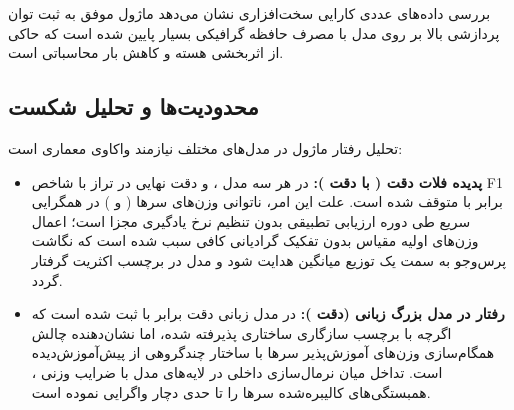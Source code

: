 بررسی داده‌های عددی کارایی سخت‌افزاری نشان می‌دهد ماژول موفق به ثبت توان پردازشی بالا  بر روی مدل  با مصرف حافظه گرافیکی بسیار پایین  شده است که حاکی از اثربخشی هسته  و کاهش بار محاسباتی است.

\subsection{محدودیت‌ها و تحلیل شکست}
تحلیل رفتار ماژول در مدل‌های مختلف نیازمند واکاوی معماری است:
\begin{itemize}
    \item \textbf{پدیده فلات دقت ( با دقت ):} در هر سه مدل ،  و  دقت نهایی در تراز  با شاخص F1 برابر با  متوقف شده است. علت این امر، ناتوانی وزن‌های سرها ( و ) در همگرایی سریع طی دوره ارزیابی تطبیقی بدون تنظیم نرخ یادگیری مجزا است؛ اعمال وزن‌های اولیه مقیاس بدون تفکیک گرادیانی کافی سبب شده است که نگاشت پرس‌وجو به سمت یک توزیع میانگین هدایت شود و مدل در برچسب اکثریت گرفتار گردد.
    \item \textbf{رفتار در مدل بزرگ زبانی  (دقت ):} در مدل زبانی  دقت برابر با  ثبت شده است که اگرچه با برچسب سازگاری ساختاری  پذیرفته شده، اما نشان‌دهنده چالش همگام‌سازی وزن‌های آموزش‌پذیر سرها با ساختار چندگروهی از پیش‌آموزش‌دیده  است. تداخل میان نرمال‌سازی داخلی  در لایه‌های مدل با ضرایب وزنی ، همبستگی‌های کالیبره‌شده سرها را تا حدی دچار واگرایی نموده است.
\end{itemize}
